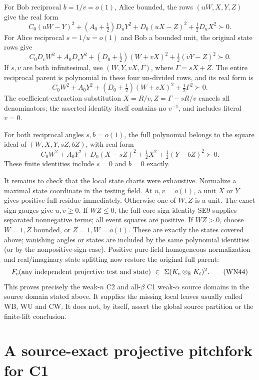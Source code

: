 For Bob reciprocal \(b=1/v=o(1)\), Alice bounded, the rows
\((uW,X,Y,Z)\) give the real form
\[
 C_0(uW-Y)^2+(A_0+\tfrac12)D_uY^2+
                 D_0(uX-Z)^2+\tfrac12D_uX^2\succ0.
 \tag{WN41}
\]
For Alice reciprocal \(s=1/u=o(1)\) and Bob a bounded unit,
the original state rows give
\[
 C_0D_vW^2+A_0D_vY^2+
       (D_0+\tfrac12)(W+vX)^2+\tfrac12(vY-Z)^2\succ0.
\]
If \(s,v\) are both infinitesimal, use
\((W,Y,vX,\Gamma)\), where \(\Gamma=sX+Z\).
The entire reciprocal parent is polynomial in these four
un-divided rows, and its real form is
\[
 C_0W^2+A_0Y^2+
                 (D_0+\tfrac12)(W+vX)^2+\tfrac12\Gamma^2\succ0.
 \tag{WN42}
\]
The coefficient-extraction substitution \(X=R/v,Z=\Gamma-sR/v\)
cancels all denominators; the asserted identity itself contains
no \(v^{-1}\), and includes literal \(v=0\).

For both reciprocal angles \(s,b=o(1)\), the full polynomial
belongs to the square ideal of \((W,X,Y,sZ,bZ)\), with real form
\[
 C_0W^2+A_0Y^2+D_0(X-sZ)^2+
                    \tfrac12X^2+\tfrac12(Y-bZ)^2\succ0.
 \tag{WN43}
\]
These finite identities include \(s=0\) and \(b=0\) exactly.

It remains to check that the local state charts were exhaustive.
Normalize a maximal state coordinate in the testing field.
At \(u,v=o(1)\), a unit \(X\) or \(Y\) gives positive full
residue immediately. Otherwise one of \(W,Z\) is a unit.
The exact sign gauges give \(u,v\geq0\).
If \(WZ\leq0\), the full-core sign identity SE9 supplies
separated nonnegative terms; all event squares are positive.
If \(WZ>0\), choose \(W=1,Z\) bounded, or \(Z=1,W=o(1)\).
These are exactly the states covered above; vanishing angles
or states are included by the same polynomial identities
(or by the nonpositive-sign case).
Positive pure-field homogeneous normalization and real/imaginary
state splitting now restore the original full parent:
\[
 F_c(\hbox{any independent projective test and state})
       \ \in\ \Sigma(K_c\otimes_{\mathbb R}K_t)^2 .
 \tag{WN44}
\]
This proves precisely the weak-\(n\) C2 and all-\(\beta\) C1
weak-\(\alpha\) source domains in the source domain stated above.
It supplies the missing local leaves usually called WB, WU
and CW. It does not, by itself, assert the global source
partition or the finite-lift conclusion.



\section{\texorpdfstring{A source-exact projective pitchfork for C1}{A source-exact projective pitchfork for C1}}
\label{component:p2cdf6197677b}

